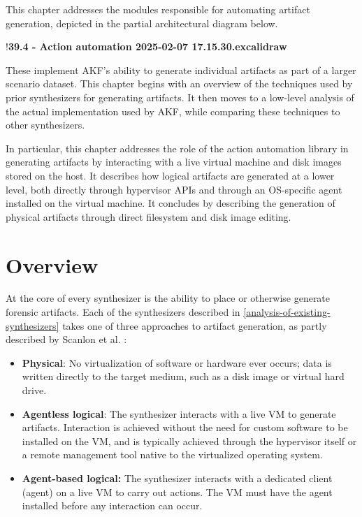 This chapter addresses the modules responsible for automating artifact
generation, depicted in the partial architectural diagram below.

!\textbf{39.4 - Action automation 2025-02-07 17.15.30.excalidraw}

These implement AKF's ability to generate individual artifacts as part
of a larger scenario dataset. This chapter begins with an overview of
the techniques used by prior synthesizers for generating artifacts. It
then moves to a low-level analysis of the actual implementation used by
AKF, while comparing these techniques to other synthesizers.

In particular, this chapter addresses the role of the action automation
library in generating artifacts by interacting with a live virtual
machine and disk images stored on the host. It describes how logical
artifacts are generated at a lower level, both directly through
hypervisor APIs and through an OS-specific agent installed on the
virtual machine. It concludes by describing the generation of physical
artifacts through direct filesystem and disk image editing.

\section{Overview}\label{overview}

At the core of every synthesizer is the ability to place or otherwise
generate forensic artifacts. Each of the synthesizers described in
\ref{analysis-of-existing-synthesizers} takes one of three approaches to artifact generation, as
partly described by Scanlon et al.
\cite{scanlonEviPlantEfficientDigital2017}:

\begin{itemize}
\tightlist
\item
  \textbf{Physical}: No virtualization of software or hardware ever
  occurs; data is written directly to the target medium, such as a disk
  image or virtual hard drive.\\
\item
  \textbf{Agentless logical}: The synthesizer interacts with a live VM
  to generate artifacts. Interaction is achieved without the need for
  custom software to be installed on the VM, and is typically achieved
  through the hypervisor itself or a remote management tool native to
  the virtualized operating system.\\
\item
  \textbf{Agent-based logical:} The synthesizer interacts with a
  dedicated client (agent) on a live VM to carry out actions. The VM
  must have the agent installed before any interaction can occur.
\end{itemize}

